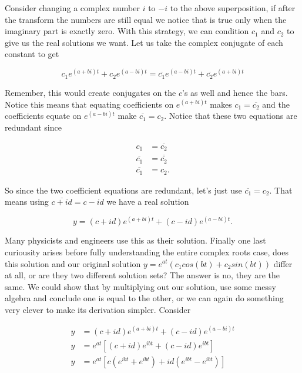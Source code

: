 \documentclass[12pt]{article}
\begin{document}
Consider changing a complex number $i$ to $-i$ to the above superposition, if after the transform the numbers are still equal we notice that is true only when the imaginary part is exactly zero. With this strategy, we can condition $c_1$ and $c_2$ to give us the real solutions we want. Let us take the complex conjugate of each constant to get

\begin{equation*}
 c_1e^{(a+bi)t}+c_2e^{(a-bi)t}  = \overline{c_1}e^{(a-bi)t}+\overline{c_2}e^{(a+bi)t}
\end{equation*}

Remember, this would create conjugates on the $c$'s as well and hence the bars. Notice this means that equating coefficients on $e^{(a+bi)t}$ makes $c_1 = \overline{c_2}$ and the coefficients equate on $e^{(a-bi)t}$ make $\overline{c_1} = c_2$. Notice that these two equations are redundant since

\begin{align*}
    c_1 &= \overline{c_2} \\
    \overline{c_1} &= \overline{\overline{c_2}} \\
    \overline{c_1} &= c_2.
\end{align*}

So since the two coefficient equations are redundant, let's just use $\overline{c_1} = c_2$. That means using $\overline{c+id}=c-id$ we have a real solution

\begin{equation*}
    y = (c+id)e^{(a+bi)t}+(c-id)e^{(a-bi)t}.
\end{equation*}

Many physicists and engineers use this as their solution. Finally one last curiousity arises before fully understanding the entire complex roots case, does this solution and our original solution $y = e^{at}(c_1cos(bt)+c_2sin(bt))$ differ at all, or are they two different solution sets? The answer is no, they are the same. We could show that by multiplying out our solution, use some messy algebra and conclude one is equal to the other, or we can again do something very clever to make its derivation simpler. Consider

\begin{align*}
    y &= (c+id)e^{(a+bi)t}+(c-id)e^{(a-bi)t} \\
    y &= e^{at}[(c+id)e^{ibt}+(c-id)e^{ibt}] \\
    y &= e^{at}[c(e^{ibt}+e^{ibt})+id(e^{ibt}-e^{ibt})] \\
\end{align*}
\end{document}
